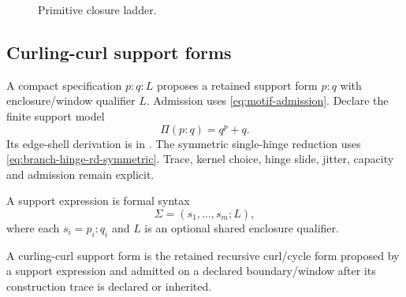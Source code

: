 \begin{figure}[H]
\centering
{}
\caption{Primitive closure ladder.}
\label{fig:closure-ladder}
\end{figure}

\subsection{Curling-curl support forms}\label{subsec:curling-curl-support-forms}

A compact specification \(p{:}q{:}L\) proposes a retained support form
\(p{:}q\) with enclosure/window qualifier \(L\). Admission uses
\eqref{eq:motif-admission}. Declare the finite support model
\begin{equation}
\Pi(p{:}q)=q^p+q.
\label{eq:curling-support-model}
\end{equation}
Its edge-shell derivation is in .
The symmetric single-hinge reduction uses \eqref{eq:branch-hinge-rd-symmetric}.
Trace, kernel choice, hinge slide, jitter, capacity and admission remain explicit.

\begin{definition}
A support expression is formal syntax
\begin{equation}
\Sigma=(s_1,\ldots,s_m;L),
\label{eq:support-expression}
\end{equation}
where each \(s_i=p_i{:}q_i\) and \(L\) is an optional shared enclosure qualifier.
\end{definition}

\begin{definition}
A curling-curl support form is the retained recursive curl/cycle form proposed by a support expression and admitted on a declared boundary/window after its construction trace is declared or inherited.
\end{definition}


